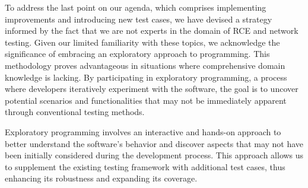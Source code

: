 To address the last point on our agenda, which comprises implementing improvements and introducing new test cases, we have devised a strategy informed by the fact that we are not experts in the domain of \ac{RCE} and network testing. Given our limited familiarity with these topics, we acknowledge the significance of embracing an exploratory approach to programming. This methodology proves advantageous in situations where comprehensive domain knowledge is lacking. By participating in exploratory programming, a process where developers iteratively experiment with the software, the goal is to uncover potential scenarios and functionalities that may not be immediately apparent through conventional testing methods. 

Exploratory programming involves an interactive and hands-on approach to better understand the software's behavior and discover aspects that may not have been initially considered during the development process. This approach allows us to supplement the existing testing framework with additional test cases, thus enhancing its robustness and expanding its coverage.